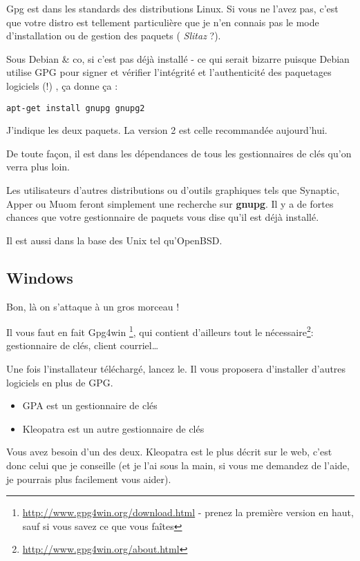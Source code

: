 Gpg est dans les standards des distributions Linux. Si vous ne l'avez
pas, c'est que votre distro est tellement particulière que je n'en
connais pas le mode d'installation ou de gestion des paquets (
\emph{Slitaz} ?).

Sous Debian \& co, si c'est pas déjà installé - ce qui serait bizarre
puisque Debian utilise GPG pour signer et vérifier l'intégrité et
l'authenticité des paquetages logiciels (!) , ça donne ça :

\begin{lstlisting}
apt-get install gnupg gnupg2
\end{lstlisting}

J'indique les deux paquets. La version 2 est celle recommandée
aujourd'hui.

De toute façon, il est dans les dépendances de tous les gestionnaires de
clés qu'on verra plus loin.

Les utilisateurs d'autres distributions ou d'outils graphiques tels que
Synaptic, Apper ou Muom feront simplement une recherche sur
\textbf{gnupg}. Il y a de fortes chances que votre gestionnaire de
paquets vous dise qu'il est déjà installé.

Il est aussi dans la base des Unix tel qu'OpenBSD.

\subsection{Windows}\label{windows}

Bon, là on s'attaque à un gros morceau !

Il vous faut en fait Gpg4win \footnote{\url{http://www.gpg4win.org/download.html} - prenez la première version en haut, sauf si vous savez ce que vous
faîtes}, qui contient d'ailleurs tout le nécessaire\footnote{\url{http://www.gpg4win.org/about.html}}: gestionnaire de clés, client
courriel\ldots{}

Une fois l'installateur téléchargé, lancez le. Il vous proposera d'installer d'autres logiciels en plus de GPG.

\begin{itemize}
\itemsep1pt\parskip0pt
\item
  GPA est un gestionnaire de clés
\item
  Kleopatra est un autre gestionnaire de clés
\end{itemize}

Vous avez besoin d'un des deux. Kleopatra est le plus décrit sur le web,
c'est donc celui que je conseille (et je l'ai sous la main, si vous me
demandez de l'aide, je pourrais plus facilement vous aider).

